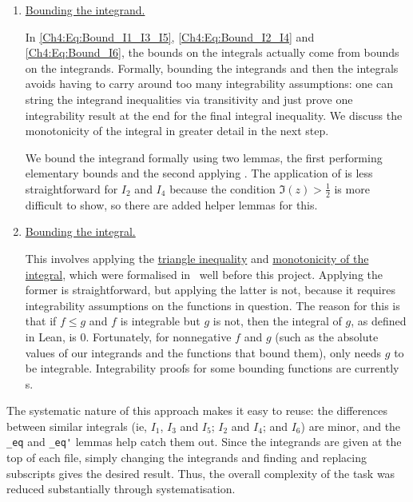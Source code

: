 \begin{enumerate}
    \item \underline{Bounding the integrand.}

    In \eqref{Ch4:Eq:Bound_I1_I3_I5}, \eqref{Ch4:Eq:Bound_I2_I4} and \eqref{Ch4:Eq:Bound_I6}, the bounds on the integrals actually come from bounds on the integrands. Formally, bounding the integrands and then the integrals avoids having to carry around too many integrability assumptions: one can string the integrand inequalities via transitivity and just prove one integrability result at the end for the final integral inequality. We discuss the monotonicity of the integral in greater detail in the next step.
    
    We bound the integrand formally using two lemmas, the first performing elementary bounds and the second applying . The application of  is less straightforward for $I_2$ and $I_4$ because the condition $\Im(z) > \frac{1}{2}$ is more difficult to show, so there are added helper lemmas for this.

    \item \underline{Bounding the integral.}

    This involves applying the \href{https://github.com/leanprover-community/mathlib4/blob/5a2eaa85c555c4263e15928cef249cbaad2eb2d2/Mathlib/MeasureTheory/Integral/Bochner/Basic.lean#L927}{triangle inequality} and \href{https://github.com/leanprover-community/mathlib4/blob/5a2eaa85c555c4263e15928cef249cbaad2eb2d2/Mathlib/MeasureTheory/Integral/Bochner/Set.lean#L645}{monotonicity of the integral}, which were formalised in \mathlib\ well before this project. Applying the former is straightforward, but applying the latter is not, because it requires integrability assumptions on the functions in question. The reason for this is that if $f \leq g$ and $f$ is integrable but $g$ is not, then the integral of $g$, as defined in Lean, is $0$. Fortunately, for nonnegative $f$ and $g$ (such as the absolute values of our integrands and the functions that bound them), only needs $g$ to be integrable. Integrability proofs for some bounding functions are currently \sorry s.
\end{enumerate}

The systematic nature of this approach makes it easy to reuse: the differences between similar integrals (ie, $I_1$, $I_3$ and $I_5$; $I_2$ and $I_4$; and $I_6$) are minor, and the \lstinline|_eq| and \lstinline|_eq'| lemmas help catch them out. Since the integrands are given at the top of each file, simply changing the integrands and finding and replacing subscripts gives the desired result. Thus, the overall complexity of the task was reduced substantially through systematisation.

